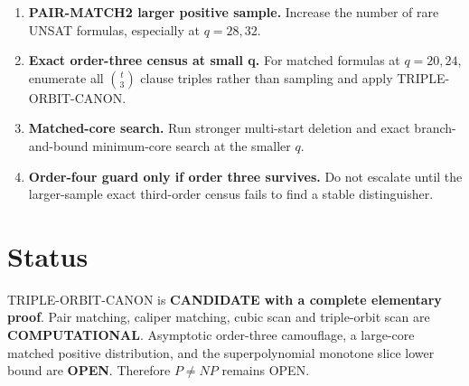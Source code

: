 \documentclass[11pt]{article}
\begin{document}
\begin{enumerate}
\item \textbf{PAIR-MATCH2 larger positive sample.}
Increase the number of rare UNSAT formulas, especially at \(q=28,32\).

\item \textbf{Exact order-three census at small q.}
For matched formulas at \(q=20,24\), enumerate all \(\binom t3\) clause triples
rather than sampling and apply TRIPLE-ORBIT-CANON.

\item \textbf{Matched-core search.}
Run stronger multi-start deletion and exact branch-and-bound minimum-core
search at the smaller \(q\).

\item \textbf{Order-four guard only if order three survives.}
Do not escalate until the larger-sample exact third-order census fails to find
a stable distinguisher.
\end{enumerate}

\section{Status}

TRIPLE-ORBIT-CANON is \textbf{CANDIDATE with a complete elementary proof}.
Pair matching, caliper matching, cubic scan and triple-orbit scan are
\textbf{COMPUTATIONAL}. Asymptotic order-three camouflage, a large-core matched
positive distribution, and the superpolynomial monotone slice lower bound are
\textbf{OPEN}. Therefore \(P\ne NP\) remains OPEN.
\end{document}
